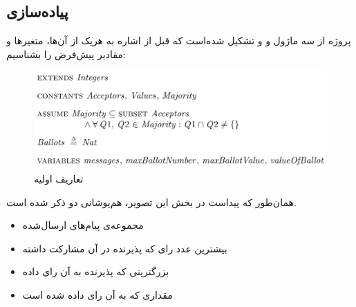 \documentclass{article}
\begin{document}
\begin{multicols}{2}
\section*{پیاده‌سازی}
پروژه از سه ماژول
و
و
تشکیل شده‌است که قبل از اشاره به هریک از آن‌ها، متغیر‌ها و مقادیر پیش‌فرض را بشناسیم:
\begin{figure}[H]
    \centering
    \includegraphics[width=0.99\linewidth]{Photos/HW6/vars.png}
    \caption{
    تعاریف اولیه
    }
    \label{fig:my_label}
\end{figure}
همان‌طور که پیداست در بخش
این تصویر، هم‌پوشانی دو
ذکر شده است.
\begin{itemize}
    \item {}
    مجموعه‌ی پیام‌های ارسال‌شده
    \item {}
    بیشترین عدد رای که پذیرنده در آن مشارکت داشته
    \item {}
    بزرگترینی که پذیرنده به آن رای داده
    \item {}
    مقداری که به آن رای داده شده است
\end{itemize}


\end{multicols}
\end{document}
